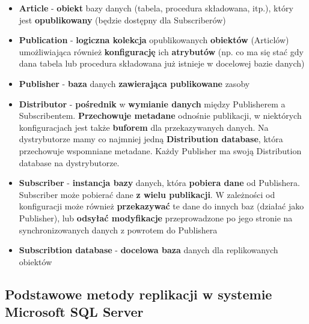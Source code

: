 \documentclass[a4paper]{article}
\begin{document}
    \begin{itemize}[noitemsep]
        \item \textbf{Article} - \textbf{obiekt} bazy danych (tabela, procedura składowana, itp.), który jest
        \textbf{opublikowany} (będzie dostępny dla Subscriberów)
        \item \textbf{Publication} - \textbf{logiczna kolekcja} opublikowanych \textbf{obiektów} (Articlów)
        umożliwiająca również \textbf{konfigurację} ich \textbf{atrybutów} (np. co ma się stać gdy dana tabela lub
        procedura składowana już istnieje w docelowej bazie danych)
        \item \textbf{Publisher} - \textbf{baza} danych \textbf{zawierająca publikowane} zasoby
        \item \textbf{Distributor} - \textbf{pośrednik} w \textbf{wymianie danych} między Publisherem a Subscribentem.
        \textbf{Przechowuje metadane} odnośnie publikacji, w niektórych konfiguracjach jest także \textbf{buforem} dla
        przekazywanych danych. Na dystrybutorze mamy co najmniej jedną \textbf{Distribution database}, która przechowuje
        wspomniane metadane. Każdy Publisher ma swoją Distribution database na dystrybutorze.
        \item \textbf{Subscriber} - \textbf{instancja bazy} danych, która \textbf{pobiera dane} od Publishera.
        Subscriber może pobierać dane \textbf{z wielu publikacji}. W zależności od konfiguracji może również
        \textbf{przekazywać} te dane do innych baz (działać jako Publisher), lub \textbf{odsyłać modyfikacje}
        przeprowadzone po jego stronie na synchronizowanych danych z powrotem do Publishera
        \item \textbf{Subscribtion database} - \textbf{docelowa baza} danych dla replikowanych obiektów
    \end{itemize}

    \subsection{Podstawowe metody replikacji w systemie Microsoft SQL Server}
\end{document}

